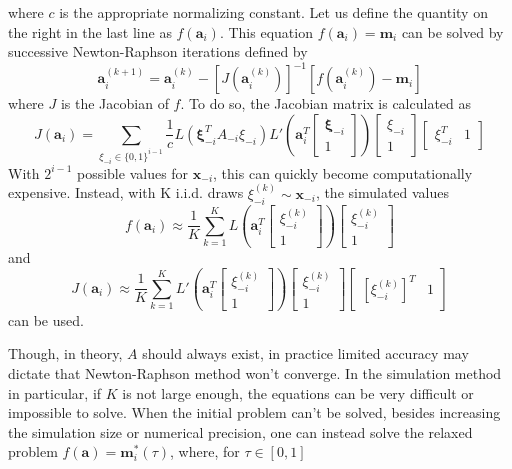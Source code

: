 \documentclass[11pt]{article}
\theoremstyle{definition}
\begin{document}
            where $c$ is the appropriate normalizing constant. Let us define the quantity on the right in the last line as $f(\mathbf a_i)$. This equation $f(\mathbf a_i)=\mathbf{m}_i$ can be solved by successive Newton-Raphson iterations defined by 
            \[\mathbf a_i^{(k+1)} = \mathbf a_i^{(k)} - \left[J\left(\mathbf a_i^{(k)}\right) \right]^{-1}\left[f\left(\mathbf a_i^{(k)}\right)-\mathbf m_i\right] \]
            where $J$ is the Jacobian of $f$. To do so, the Jacobian matrix is calculated as 
        \[ J\left( \mathbf a_i\right) = \sum_{\xi_{-i} \in \{0,1\}^{i-1}} \frac{1}{c}L\left(\mathbf \xi_{-i}^TA_{-i}\xi_{-i}\right) L'\left(\mathbf{a}_i^T\left[\begin{array}{c} \mathbf \xi_{-i} \\ 1 \end{array}\right]\right)\left[\begin{array}{c} \xi_{-i} \\ 1 \end{array}\right]\left[\begin{array}{cc} \xi_{-i}^T & 1 \end{array}\right] \]
            With $2^{i-1}$ possible values for $\mathbf x_{-i}$, this can quickly become computationally expensive. Instead, with K i.i.d. draws $\xi_{-i}^{(k)}\sim \mathbf x_{-i}$, the simulated values 
            \[f\left(\mathbf a_i\right) \approx \frac{1}{K}\sum_{k=1}^K L\left(\mathbf{a}_i^T\left[\begin{array}{c} \xi_{-i}^{(k)} \\ 1 \end{array}\right]\right)\left[\begin{array}{c} \xi_{-i}^{(k)} \\ 1 \end{array}\right] \]
            and
            \[J\left( \mathbf a_i\right) \approx \frac{1}{K}\sum_{k=1}^K L'\left(\mathbf{a}_i^T\left[\begin{array}{c} \xi_{-i}^{(k)} \\ 1 \end{array}\right]\right)\left[\begin{array}{c} \xi_{-i}^{(k)} \\ 1 \end{array}\right]\left[\begin{array}{cc} [\xi_{-i}^{(k)}]^T & 1 \end{array}\right] \]
            can be used. \par
            Though, in theory, $A$ should always exist, in practice limited accuracy may dictate that Newton-Raphson method won't converge. In the simulation method in particular, if $K$ is not large enough, the equations can be very difficult or impossible to solve. When the initial problem can't be solved, besides increasing the simulation size or numerical precision, one can instead solve the relaxed problem  $f(\mathbf a)=\mathbf m_i^*(\tau)$, where, for $\tau\in[0,1]$
\end{document}
